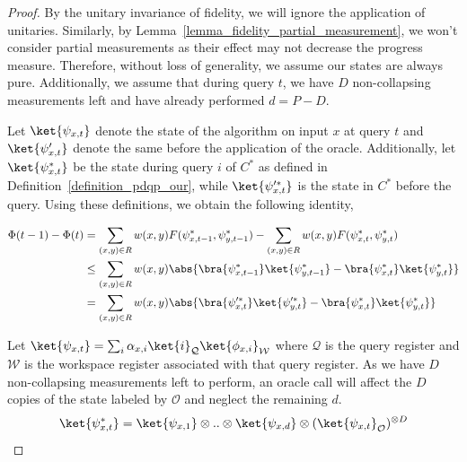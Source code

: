\begin{proof}
    By the unitary invariance of fidelity, we will ignore the application of unitaries. Similarly, by Lemma~\ref{lemma_fidelity_partial_measurement}, we won't consider partial measurements as their effect may not decrease the progress measure. Therefore, without loss of generality, we assume our states are always pure. Additionally, we assume that during query $t$, we have $D$ non-collapsing measurements left and have already performed $d=P-D$.

    Let $\ket{\psi_{x,t}}$ denote the state of the algorithm on input $x$ at query $t$ and $\ket{\psi_{x,t}^\prime}$ denote the same before the application of the oracle. Additionally, let $\ket{\psi_{x,t}^*}$ be the state during query $i$ of $C^*$ as defined in Definition~\ref{definition_pdqp_our}, while $\ket{\psi_{x,t}^{\prime *}}$ is the state in $C^*$ before the query. Using these definitions, we obtain the following identity,

    \begin{align}
        \Phi(t-1) - \Phi(t) &= \sum_{(x,y)\in R} w(x,y) F( \psi_{x, t-1}^*,\psi_{y, t-1}^* ) - \sum_{(x,y)\in R} w(x,y) F(\psi_{x, t}^*,\psi_{y, t}^* )\\
        & \leq \sum_{(x,y)\in R} w(x,y) \abs{ \bra{\psi_{x,t-1}^*}\ket{\psi_{y,t-1}^*}  -  \bra{\psi_{x,t}^*}\ket{\psi_{y,t}^*}}\\ 
        &= \sum_{(x,y)\in R} w(x,y) \abs{\bra{\psi_{x,t}^{\prime *}}\ket{\psi_{y,t}^{\prime *}}  - \bra{\psi_{x,t}^*}\ket{\psi_{y,t}^*}} \label{eq_progress_simplification}
    \end{align}
    
    Let $\ket{\psi_{x,t}} = \sum_{i} \alpha_{x,i} \ket{i}_\mathcal{Q}\ket{\phi_{x,i}}_\mathcal{W}$ where $\mathcal{Q}$ is the query register and $\mathcal{W}$ is the workspace register associated with that query register. As we have $D$ non-collapsing measurements left to perform, an oracle call will affect the $D$ copies of the state labeled by $\mathcal{O}$ and neglect the remaining $d$.
    \begin{align*}
        \ket{\psi_{x,t}^*} = \ket{\psi_{x,1}}\otimes..\otimes\ket{\psi_{x,d}}\otimes (\ket{\psi_{x,t}}_\mathcal{O})^{\otimes D}
    \end{align*}


\end{proof}

